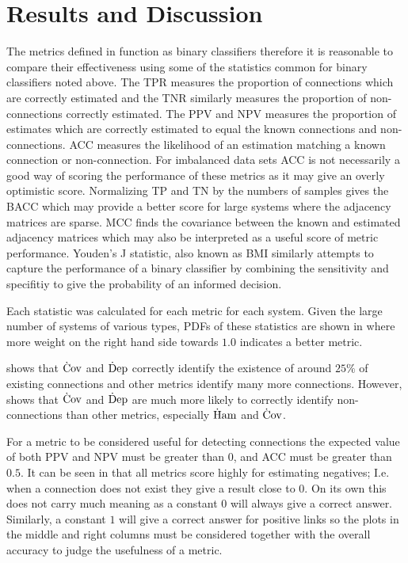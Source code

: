 \documentclass[runningheads]{llncs}
\begin{document}

\section{Results and Discussion} %
\label{sec:results}

The metrics defined in  function as binary classifiers
therefore it is reasonable to compare their effectiveness using some of the
statistics common for binary classifiers noted above.
The \gls{TPR} measures the proportion of connections which are correctly
estimated and the \gls{TNR} similarly measures the proportion of
non-connections correctly estimated.
The \gls{PPV} and \gls{NPV} measures the proportion of estimates which are
correctly estimated to equal the known connections and non-connections.
\gls{ACC} measures the likelihood of an estimation matching a known connection
or non-connection.
For imbalanced data sets \gls{ACC} is not necessarily a good way of scoring the
performance of these metrics as it may give an overly optimistic score.
Normalizing \gls{TP} and \gls{TN} by the numbers of samples gives the
\acrlong{BACC}\cite{Mower2005} which may provide a better score for large systems
where the adjacency matrices are sparse.
\acrlong{MCC} finds the covariance between the known and estimated adjacency
matrices which may also be interpreted as a useful score of metric performance.
Youden's J statistic, also known as \acrlong{BMI} similarly attempts to capture
the performance of a binary classifier by combining the sensitivity and
specifitiy to give the probability of an informed decision.

Each statistic was calculated for each metric for each system.
Given the large number of systems of various types, \glspl{PDF} of these
statistics are shown in  where more weight on the right
hand side towards $1.0$ indicates a better metric.

 shows that $\operatorname{\dot{C}ov}$ and $\operatorname{\dot{D}ep}$ correctly identify the
existence of around $25\%$ of existing connections and other metrics identify
many more connections.
However,  shows that $\operatorname{\dot{C}ov}$ and $\operatorname{\dot{D}ep}$ are much more
likely to correctly identify non-connections than other metrics, especially
$\operatorname{\dot{H}am}$ and $\operatorname{\dot{C}ov}$.

For a metric to be considered useful for detecting connections the expected
value of both \gls{PPV} and \gls{NPV} must be greater than $0$,
and \gls{ACC} must be greater than $0.5$.
It can be seen in  that all metrics score highly for
estimating negatives;
I.e. when a connection does not exist they give a result close to $0$.
On its own this does not carry much meaning as a constant $0$ will always
give a correct answer.
Similarly, a constant $1$ will give a correct answer for positive links
so the plots in the middle and right columns must be considered together with
the overall accuracy to judge the usefulness of a metric.
\end{document}
